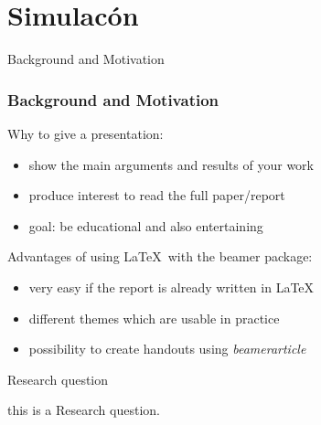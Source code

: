 \section{Simulacón}
\begin{frame}{Background and Motivation}
    \frametitle<presentation>{Background and Motivation}
    \begin{block}{Why to give a presentation:}
        \begin{itemize}
            \item show the main arguments and results of your work
            \item produce interest to read the full paper/report
            \item goal: be educational and also entertaining
        \end{itemize}
    \end{block}
    \begin{block}{Advantages of using \LaTeX ~with the beamer package:}
        \begin{itemize}
            \item very easy if the report is already written in \LaTeX
            \item different themes which are usable in practice
            \item possibility to create handouts using \emph{beamerarticle}
        \end{itemize}
    \end{block}
\end{frame}

\begin{frame}{Research question}

    this is a Research question.

\end{frame}
